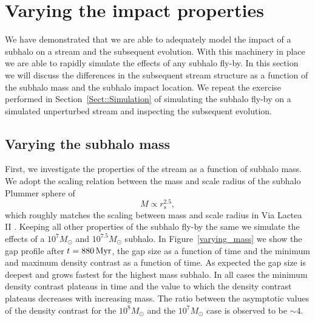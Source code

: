 \documentclass[useAMS,usenatbib,fleqn,a4paper]{mn2e}
\def\Myr{\,{\rm Myr}}
\begin{document}
\section{Varying the impact properties}\label{Sect::Variation}
We have demonstrated that we are able to adequately model the impact of a subhalo on a stream and the subsequent evolution. With this machinery in place we are able to rapidly simulate the effects of any subhalo fly-by. In this section we will discuss the differences in the subsequent stream structure as a function of the subhalo mass and the subhalo impact location. We repeat the exercise performed in Section~\ref{Sect::Simulation} of simulating the subhalo fly-by on a simulated unperturbed stream and inspecting the subsequent evolution.

\subsection{Varying the subhalo mass}
First, we investigate the properties of the stream as a function of subhalo mass. We adopt the scaling relation between the mass and scale radius of the subhalo Plummer sphere of
\begin{equation}
M\propto r_s^{2.5},
\end{equation}
which roughly matches the scaling between mass and scale radius in Via Lactea II \citep{Diemand2008}. Keeping all other properties of the subhalo fly-by the same we simulate the effects of a $10^7M_\odot$ and $10^{7.5}M_\odot$ subhalo. In Figure~\ref{varying_mass} we show the gap profile after $t=880\Myr$, the gap size as a function of time and the minimum and maximum density contrast as a function of time. As expected the gap size is deepest and grows fastest for the highest mass subhalo. In all cases the minimum density contrast plateaus in time and the value to which the density contrast plateaus decreases with increasing mass. The ratio between the asymptotic values of the density contrast for the $10^8M_\odot$ and the $10^7M_\odot$ case is observed to be $\sim4$.
\end{document}
